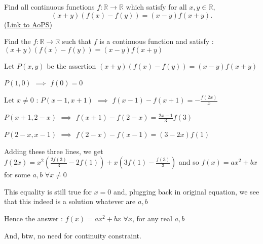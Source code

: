 \begin{problem}
	Find all continuous functions $f: \mathbb R \to \mathbb R$ which satisfy for all $x, y \in \mathbb R$,
\[(x+y)(f(x)-f(y))=(x-y)f(x+y).\]
	\flushright \href{https://artofproblemsolving.com/community/c6h394338}{(Link to AoPS)}
\end{problem}



\begin{solution}
	\begin{tcolorbox}Find the $f:\mathbb{R} \to \mathbb{R}$ such that $f$ is a continuous function and satisfy :
$(x+y)(f(x)-f(y))=(x-y)f(x+y)$\end{tcolorbox}
Let $P(x,y)$ be the assertion $(x+y)(f(x)-f(y))=(x-y)f(x+y)$

$P(1,0)$ $\implies$ $f(0)=0$

Let $x\ne 0$ :
$P(x-1,x+1)$ $\implies$ $f(x-1)-f(x+1)=-\frac{f(2x)}x$

$P(x+1,2-x)$ $\implies$ $f(x+1)-f(2-x)=\frac {2x-1}{3}f(3)$

$P(2-x,x-1)$ $\implies$ $f(2-x)-f(x-1)=(3-2x)f(1)$

Adding these three lines, we get $f(2x)=x^2\left(\frac{2f(3)}3-2f(1)\right)+x\left(3f(1)-\frac{f(3)}3\right)$ and so $f(x)=ax^2+bx$ for some $a,b$ $\forall x\ne 0$

This equality is still true for $x=0$ and, plugging back in original equation, we see that this indeed is a solution whatever are $a,b$

Hence the answer : $\boxed{f(x)=ax^2+bx}$ $\forall x$, for any real $a,b$

And, btw, no need for continuity constraint.
\end{solution}



